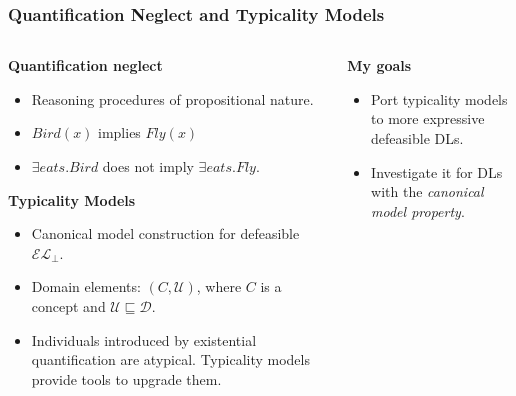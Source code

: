 \documentclass[12pt]{beamer}
\begin{document}
\begin{frame}
\frametitle{Quantification Neglect and Typicality Models}
\begin{columns}
\begin{column}{0.6\textwidth}

{\footnotesize 
\textbf{Quantification neglect}
\vspace{-0.7em}
\begin{itemize}
    \itemsep-0.3em
    \item Reasoning procedures of propositional nature.
    \item $Bird(x)$ implies $Fly(x)$
    \item $\exists eats.Bird$ does not imply $\exists eats.Fly$.
\end{itemize}

\textbf{Typicality Models}
\vspace{-0.7em}
\begin{itemize}
    \itemsep-0.3em
    \item Canonical model construction for defeasible $\mathcal{EL}_\bot$.
    \item Domain elements: $(C, \mathcal{U})$, where $C$ is a concept and $\mathcal{U} \sqsubseteq \mathcal{D}$.
    \item Individuals introduced by existential quantification are atypical. Typicality models provide tools to upgrade them. %
\end{itemize}

}
\end{column}

\begin{column}{0.55\textwidth}  %
    
{\footnotesize 
    \textbf{My goals}
    \vspace{-0.7em}
    \begin{itemize}
        \item Port typicality models to more expressive defeasible DLs.
        \item Investigate it for DLs with the \textit{canonical model property}. 
    \end{itemize}
    
}
\end{column}
\end{columns}
\end{frame}
\end{document}
